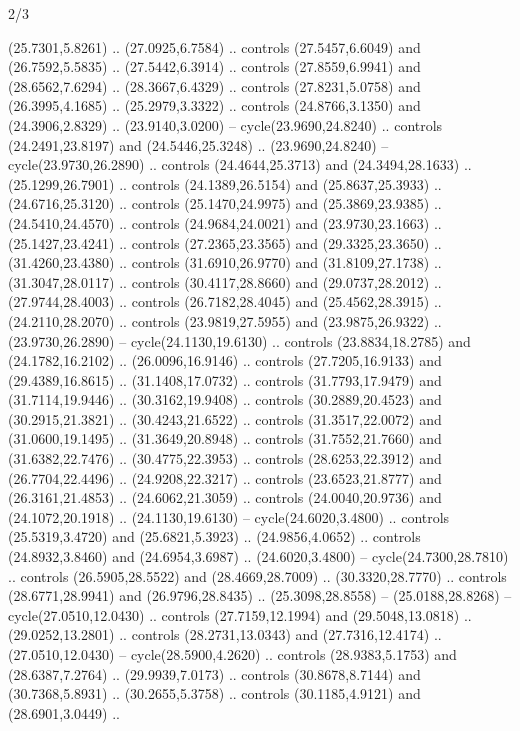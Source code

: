 \begin{flagdescription}{2/3}
\begin{scope}[yshift=\flagwidth,scale=\flagwidth/1241.93737]
\begin{scope}[y=-1mm, x=1mm,draw=gold,fill=blue,line join=miter,miter limit=4,line width=1.8\lw]
\begin{scope}[y=1mm, x=1mm, yscale=-1,shift={(573.68mm+\str,145.75)}]
\begin{scope}[scale=1.35,shift={(-9,-3)}]
\begin{scope}[scale=0.55]
\begin{scope}[scale=1.333]
    (25.7301,5.8261) .. (27.0925,6.7584) .. controls (27.5457,6.6049) and
    (26.7592,5.5835) .. (27.5442,6.3914) .. controls (27.8559,6.9941) and
    (28.6562,7.6294) .. (28.3667,6.4329) .. controls (27.8231,5.0758) and
    (26.3995,4.1685) .. (25.2979,3.3322) .. controls (24.8766,3.1350) and
    (24.3906,2.8329) .. (23.9140,3.0200) -- cycle(23.9690,24.8240) .. controls
    (24.2491,23.8197) and (24.5446,25.3248) .. (23.9690,24.8240) --
    cycle(23.9730,26.2890) .. controls (24.4644,25.3713) and (24.3494,28.1633) ..
    (25.1299,26.7901) .. controls (24.1389,26.5154) and (25.8637,25.3933) ..
    (24.6716,25.3120) .. controls (25.1470,24.9975) and (25.3869,23.9385) ..
    (24.5410,24.4570) .. controls (24.9684,24.0021) and (23.9730,23.1663) ..
    (25.1427,23.4241) .. controls (27.2365,23.3565) and (29.3325,23.3650) ..
    (31.4260,23.4380) .. controls (31.6910,26.9770) and (31.8109,27.1738) ..
    (31.3047,28.0117) .. controls (30.4117,28.8660) and (29.0737,28.2012) ..
    (27.9744,28.4003) .. controls (26.7182,28.4045) and (25.4562,28.3915) ..
    (24.2110,28.2070) .. controls (23.9819,27.5955) and (23.9875,26.9322) ..
    (23.9730,26.2890) -- cycle(24.1130,19.6130) .. controls (23.8834,18.2785) and
    (24.1782,16.2102) .. (26.0096,16.9146) .. controls (27.7205,16.9133) and
    (29.4389,16.8615) .. (31.1408,17.0732) .. controls (31.7793,17.9479) and
    (31.7114,19.9446) .. (30.3162,19.9408) .. controls (30.2889,20.4523) and
    (30.2915,21.3821) .. (30.4243,21.6522) .. controls (31.3517,22.0072) and
    (31.0600,19.1495) .. (31.3649,20.8948) .. controls (31.7552,21.7660) and
    (31.6382,22.7476) .. (30.4775,22.3953) .. controls (28.6253,22.3912) and
    (26.7704,22.4496) .. (24.9208,22.3217) .. controls (23.6523,21.8777) and
    (26.3161,21.4853) .. (24.6062,21.3059) .. controls (24.0040,20.9736) and
    (24.1072,20.1918) .. (24.1130,19.6130) -- cycle(24.6020,3.4800) .. controls
    (25.5319,3.4720) and (25.6821,5.3923) .. (24.9856,4.0652) .. controls
    (24.8932,3.8460) and (24.6954,3.6987) .. (24.6020,3.4800) --
    cycle(24.7300,28.7810) .. controls (26.5905,28.5522) and (28.4669,28.7009) ..
    (30.3320,28.7770) .. controls (28.6771,28.9941) and (26.9796,28.8435) ..
    (25.3098,28.8558) -- (25.0188,28.8268) -- cycle(27.0510,12.0430) .. controls
    (27.7159,12.1994) and (29.5048,13.0818) .. (29.0252,13.2801) .. controls
    (28.2731,13.0343) and (27.7316,12.4174) .. (27.0510,12.0430) --
    cycle(28.5900,4.2620) .. controls (28.9383,5.1753) and (28.6387,7.2764) ..
    (29.9939,7.0173) .. controls (30.8678,8.7144) and (30.7368,5.8931) ..
    (30.2655,5.3758) .. controls (30.1185,4.9121) and (28.6901,3.0449) ..

\end{scope}
\end{scope}
\end{scope}
\end{scope}
\end{scope}
\end{scope}
\end{flagdescription}
